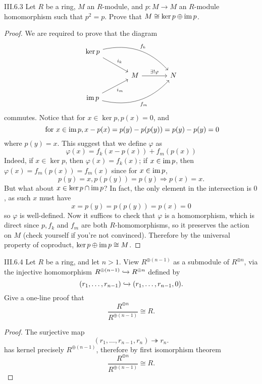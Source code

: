 \begin{problem}{III.6.3}
Let $R$ be a ring, $M$ an $R$-module, and $p : M \to M$ an $R$-module homomorphism such that $p^2 = p$. Prove that $M \cong \ker p \oplus \operatorname{im} p$.
\end{problem}
\begin{proof}
We are required to prove that the diagram
\[
\begin{tikzcd}[column sep=large]
\ker p \arrow[rd, "i_k"] \arrow[rrd, "f_k", bend left]  &                                &   \\
& M \arrow[r, "\exists!\varphi"] & N \\
\im p  \arrow[ru, "i_m"'] \arrow[rru, "f_m"', bend right] &                                &
\end{tikzcd}
\]
commutes. Notice that for $x \in \ker p, p(x) = 0$, and
\[
\text{ for } x \in \operatorname{im} p, x - p(x) = p(y) - p(p(y)) = p(y) - p(y) = 0
\]
where $p(y) = x$. This suggest that we define $\varphi$ as
\[
\varphi(x) = f_k(x - p(x)) + f_m(p(x))
\]
Indeed, if $x \in \ker p$, then $\varphi(x) = f_k(x)$; if $x \in \operatorname{im} p$, then $\varphi(x) = f_m(p(x)) = f_m(x)$ since for $x \in \operatorname{im} p$,
\[
p(y) = x, p(p(y)) = p(y) \Rightarrow p(x) = x.
\]
But what about $x \in \ker p \cap \operatorname{im} p$? In fact, the only element in the intersection is $0$, as such $x$ must have
\[
x = p(y) = p(p(y)) = p(x) = 0
\]
so $\varphi$ is well-defined. Now it suffices to check that $\varphi$ is a homomorphism, which is direct since $p, f_k$ and $f_m$ are both $R$-homomorphisms, so it preserves the action on $M$ (check yourself if you're not convinced). Therefore by the universal property of coproduct, $\ker p \oplus \operatorname{im} p \cong M$.
\end{proof}

\begin{problem}{III.6.4}
Let $R$ be a ring, and let $n > 1$. View $R^{\oplus(n-1)}$ as a submodule of $R^{\oplus n}$, via the injective homomorphism $R^{\oplus(n-1)} \xhookrightarrow{} R^{\oplus n}$ defined by
\[
(r_1,\dotsc,r_{n-1}) \xhookrightarrow{}	(r_1,\dotsc,r_{n-1}, 0).
\]
Give a one-line proof that
\[
\frac{R^{\oplus n}}{R^{\oplus (n-1)}} \cong R.
\]
\end{problem}
\begin{proof}
The surjective map
\[
(r_1,\dotsc,r_{n-1}, r_n) \twoheadrightarrow r_n.
\]
has kernel precisely $R^{\oplus (n-1)}$, therefore by first isomorphism theorem
\[
\frac{R^{\oplus n}}{R^{\oplus (n-1)}} \cong R.
\]
\end{proof}

